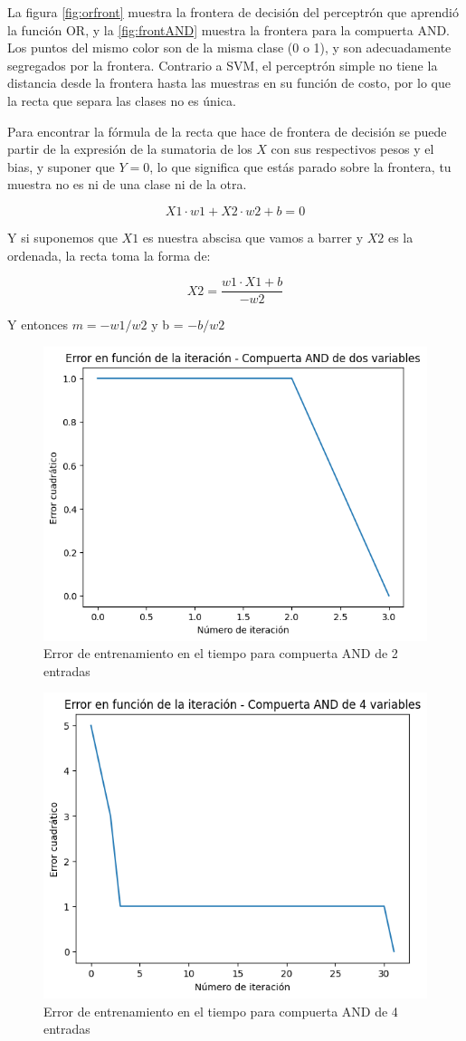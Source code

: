 \documentclass[11pt]{article} %
\begin{document}
La figura \ref{fig:orfront} muestra la frontera de decisión del perceptrón que aprendió la función OR, y la \ref{fig:frontAND} muestra la frontera para la compuerta AND. Los puntos del mismo color son de la misma clase (0 o 1), y son adecuadamente segregados por la frontera. Contrario a SVM, el perceptrón simple no tiene la distancia desde la frontera hasta las muestras en su función de costo, por lo que la recta que separa las clases no es única.

Para encontrar la fórmula de la recta que hace de frontera de decisión se puede partir de la expresión de la sumatoria de los $X$ con sus respectivos pesos y el bias, y suponer que $Y=0$, lo que significa que estás parado sobre la frontera, tu muestra no es ni de una clase ni de la otra.

$$
X1 \cdot w1 + X2 \cdot w2 + b = 0
$$

Y si suponemos que $X1$ es nuestra abscisa que vamos a barrer y $X2$ es la ordenada, la recta toma la forma de:

$$
X2 = \frac{w1 \cdot X1 + b}{-w2}
$$

Y entonces $m=-w1/w2 $ y b = $-b/w2$

\begin{figure}[h!]
	\centering
	\includegraphics[width=0.7\linewidth]{../imgs/ej1/AND2err}
	\caption[]{Error de entrenamiento en el tiempo para compuerta AND de 2 entradas}
	\label{fig:and2err}
\end{figure}


\begin{figure}[h!]
	\centering
	\includegraphics[width=0.7\linewidth]{../imgs/ej1/AND4}
	\caption[]{Error de entrenamiento en el tiempo para compuerta AND de 4 entradas}
	\label{fig:and4}
\end{figure}
\end{document}
